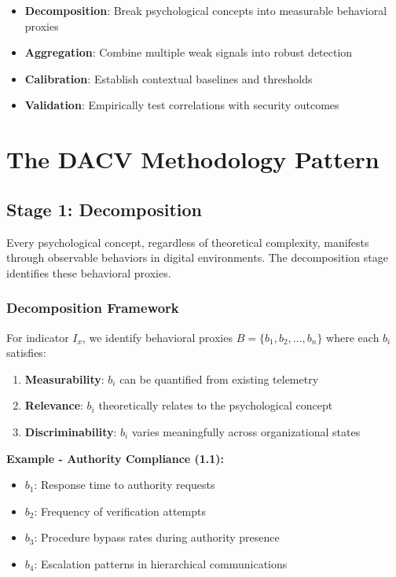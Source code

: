 \documentclass[11pt, onecolumn]{article}
\begin{document}
\begin{itemize}
\item \textbf{Decomposition}: Break psychological concepts into measurable behavioral proxies
\item \textbf{Aggregation}: Combine multiple weak signals into robust detection
\item \textbf{Calibration}: Establish contextual baselines and thresholds
\item \textbf{Validation}: Empirically test correlations with security outcomes
\end{itemize}

\section{The DACV Methodology Pattern}

\subsection{Stage 1: Decomposition}

Every psychological concept, regardless of theoretical complexity, manifests through observable behaviors in digital environments. The decomposition stage identifies these behavioral proxies.

\subsubsection{Decomposition Framework}

For indicator $I_x$, we identify behavioral proxies $B = \{b_1, b_2, ..., b_n\}$ where each $b_i$ satisfies:

\begin{enumerate}
\item \textbf{Measurability}: $b_i$ can be quantified from existing telemetry
\item \textbf{Relevance}: $b_i$ theoretically relates to the psychological concept
\item \textbf{Discriminability}: $b_i$ varies meaningfully across organizational states
\end{enumerate}

\textbf{Example - Authority Compliance (1.1):}
\begin{itemize}
\item $b_1$: Response time to authority requests
\item $b_2$: Frequency of verification attempts
\item $b_3$: Procedure bypass rates during authority presence
\item $b_4$: Escalation patterns in hierarchical communications
\end{itemize}
\end{document}
